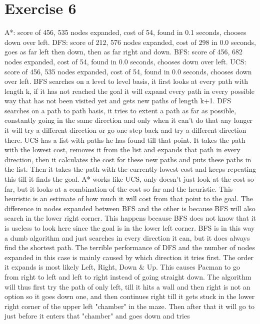 \section{Exercise 6}
A*:  score of 456, 535 nodes expanded, cost of 54, found in 0.1 seconds, chooses down over left.
DFS: score of 212, 576 nodes expanded, cost of 298 in 0.0 seconds, goes as far left then down, then as far right and down.
BFS: score of 456, 682 nodes expanded, cost of 54, found in 0.0 seconds, chooses down over left.
UCS: score of 456, 535 nodes expanded, cost of 54, found in 0.0 seconds, chooses down over left.
BFS searches on a level to level basis, it first looks at every path with length k, if it has not reached the goal 
it will expand every path in every possible way that has not been visited yet and gets new paths of length k+1.
DFS searches on a path to path basis, it tries to extent a path as far as possible, constantly going in the same direction
and only when it can't do that any longer it will try a different direction or go one step back and try a different direction there.
UCS has a list with paths he has found till that point. It takes the path with the lowest cost, removes it from the list 
and expands that path in every direction, then it calculates the cost for these new paths and puts these paths in the list. 
Then it takes the path with the currently lowest cost and keeps repeating this till it finds the goal.
A* works like UCS, only doesn't just look at the cost so far, but it looks at a combination of the cost so far and the heuristic.
This heuristic is an estimate of how much it will cost from that point to the goal.
The difference in nodes expanded between BFS and the other is because BFS will also search in the lower right corner. 
This happens because BFS does not know that it is useless to look here since the goal is in the lower left corner.
BFS is in this way a dumb algorithm and just searches in every direction it can, but it does always find the shortest path.
The terrible performance of DFS and the number of nodes expanded in this case is mainly caused by which direction it tries first. 
The order it expands is most likely Left, Right, Down & Up. This causes Pacman to go from right to left and left to right instead of going straight down. The algorithm will thus first try the path of only left, till it hits a wall and then right 
is not an option so it goes down one, and then continues right till it gets stuck in the lower right corner of the upper left "chamber"
in the maze. Then after that it will go to just before it enters that "chamber" and goes down and tries 
